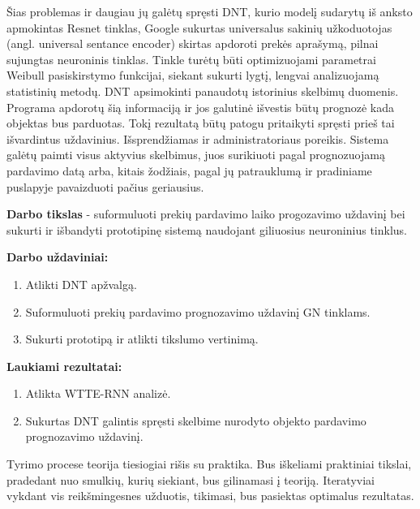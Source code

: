 \documentclass{VUMIFPSkursinis}
\begin{document}
Šias problemas ir daugiau jų galėtų spręsti DNT, kurio modelį sudarytų iš anksto apmokintas Resnet tinklas, Google sukurtas universalus sakinių užkoduotojas (angl. universal sentance encoder) skirtas apdoroti prekės aprašymą, pilnai sujungtas neuroninis tinklas. Tinkle turėtų būti optimizuojami parametrai Weibull pasiskirstymo funkcijai, siekant sukurti lygtį, lengvai analizuojamą statistinių metodų. DNT apsimokinti panaudotų istorinius skelbimų duomenis. Programa apdorotų šią informaciją ir jos galutinė išvestis būtų prognozė kada objektas bus parduotas. Tokį rezultatą būtų patogu pritaikyti spręsti prieš tai išvardintus uždavinius. Išsprendžiamas ir administratoriaus poreikis. Sistema galėtų paimti visus aktyvius skelbimus, juos surikiuoti pagal prognozuojamą pardavimo datą arba, kitais žodžiais, pagal jų patrauklumą ir pradiniame puslapyje pavaizduoti pačius geriausius. 

\textbf{Darbo tikslas} - suformuluoti prekių pardavimo laiko progozavimo uždavinį bei sukurti ir išbandyti prototipinę sistemą naudojant giliuosius neuroninius tinklus.

\vspace{3mm} %

\textbf{Darbo uždaviniai:}
\begin{enumerate}
  \item Atlikti DNT apžvalgą.%
  \item Suformuluoti prekių pardavimo prognozavimo uždavinį GN tinklams.
  \item Sukurti prototipą ir atlikti tikslumo vertinimą.
\end{enumerate}

\textbf{Laukiami rezultatai:}
\begin{enumerate}
  \item Atlikta WTTE-RNN analizė.
  \item Sukurtas DNT galintis spręsti skelbime nurodyto objekto pardavimo prognozavimo uždavinį.
\end{enumerate}

Tyrimo procese teorija tiesiogiai rišis su praktika. Bus iškeliami praktiniai tikslai, pradedant nuo smulkių, kurių siekiant, bus gilinamasi į teoriją. Iteratyviai vykdant vis reikšmingesnes užduotis, tikimasi, bus pasiektas optimalus rezultatas.

\end{document}
